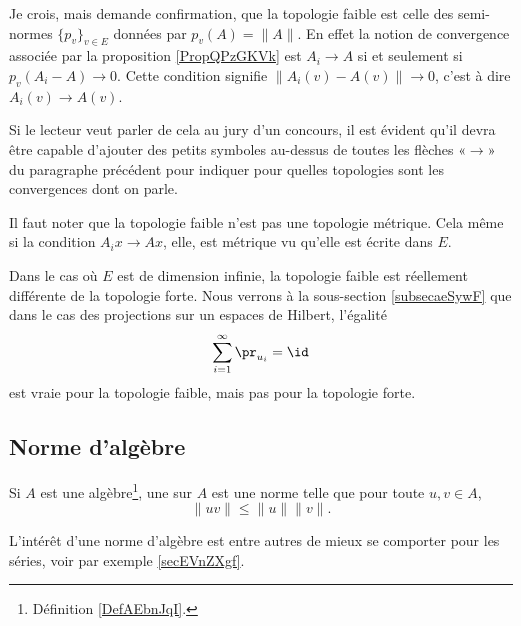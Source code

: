 \begin{probleme}
    Je crois, mais demande confirmation, que la topologie faible est celle des semi-normes \( \{ p_v \}_{v\in E}\) données par \( p_v(A)=\| A \|\). En effet la notion de convergence associée par la proposition \ref{PropQPzGKVk} est \( A_i\to A\) si et seulement si \( p_v(A_i-A)\to 0\). Cette condition signifie \( \| A_i(v)-A(v) \|\to 0\), c'est à dire \( A_i(v)\to A(v)\).

    Si le lecteur veut parler de cela au jury d'un concours, il est évident qu'il devra être capable d'ajouter des petits symboles au-dessus de toutes les flèches «\( \to\)» du paragraphe précédent pour indiquer pour quelles topologies sont les convergences dont on parle.
\end{probleme}

\begin{remark}
    Il faut noter que la topologie faible n'est pas une topologie métrique. Cela même si la condition \( A_ix\to Ax\), elle, est métrique vu qu'elle est écrite dans \( E\).

    Dans le cas où \( E\) est de dimension infinie, la topologie faible est réellement différente de la topologie forte. Nous verrons à la sous-section \ref{subsecaeSywF} que dans le cas des projections sur un espaces de Hilbert, l'égalité
    \begin{equation}
        \sum_{i=1}^{\infty}\pr_{u_i}=\id
    \end{equation}
    est vraie pour la topologie faible, mais pas pour la topologie forte.
\end{remark}

\subsection{Norme d'algèbre}

\begin{definition}  \label{DefJWRWQue}
    Si \( A\) est une algèbre\footnote{Définition \ref{DefAEbnJqI}.}, une  sur \( A\) est une norme telle que pour toute \( u,v\in A\),
    \begin{equation}
        \| uv \|\leq \| u \|\| v \|.
    \end{equation}
\end{definition}
L'intérêt d'une norme d'algèbre est entre autres de mieux se comporter pour les séries, voir par exemple \ref{secEVnZXgf}.

